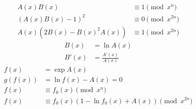 \begin{footnotesize}
\begin{align}
	A(x)B(x)&\equiv 1\pmod{x^n}\\
	(A(x)B(x)-1)^2&\equiv 0\pmod{x^{2n}}\\
	A(x)(2B(x)-B(x)^2A(x))&\equiv 1\pmod{x^{2n}}
\end{align}
\begin{align}
	B(x)&=\ln{A(x)}\\
	B'(x)&=\frac{A'(x)}{A(x)}
\end{align}
\begin{align}
	f(x)&=\exp{A(x)}\\
	g(f(x))&=\ln{f(x)}-A(x)=0\\
	f(x)&\equiv f_0(x)\pmod{x^n}\\
	f(x)&\equiv f_0(x)(1-\ln{f_0(x)}+A(x))\pmod{x^{2n}}
\end{align}
\end{footnotesize}

